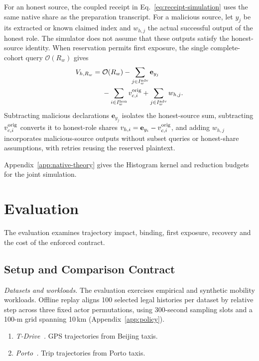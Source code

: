 \documentclass[conference,compsoc]{IEEEtran}
\theoremstyle{definition}
\numberwithin{equation}{section}
\numberwithin{table}{section}
\numberwithin{figure}{section}
\theoremstyle{plain}
\begin{document}
For an honest source, the coupled receipt in Eq.~\eqref{eq:receipt-simulation}
uses the same native share as the preparation transcript. For a malicious
source, let \(y_j\) be its extracted or known claimed index and \(w_{h,j}\)
the actual successful output of the honest role. The simulator does not assume
that these outputs satisfy the honest-source identity. When reservation permits
first exposure, the single complete-cohort query \(\mathcal O(R_w)\) gives
\begin{equation}
\begin{split}
 V_{h,R_w}={}&\mathcal O(R_w)-\sum_{j\in I_w^{\rm adv}}\mathbf e_{y_j}\\
 &-\sum_{i\in I_w^{\rm hon}}v_{c,i}^{\rm orig}
 +\sum_{j\in I_w^{\rm adv}}w_{h,j}.
\end{split}
\label{eq:simulated-honest-export}
\end{equation}
Subtracting malicious declarations \(\mathbf e_{y_j}\) isolates the honest-source sum, subtracting \(v_{c,i}^{\rm orig}\) converts it to honest-role shares \(v_{h,i}=\mathbf e_{y_i}-v_{c,i}^{\rm orig}\), and adding \(w_{h,j}\) incorporates malicious-source outputs without subset queries or honest-share assumptions, with retries reusing the reserved plaintext.

Appendix~\ref{app:native-theory} gives the Histogram kernel and reduction
budgets for the joint simulation.


\section{Evaluation}
\label{sec:evaluation}

The evaluation examines trajectory impact, binding, first exposure, recovery and the cost of the enforced contract.

\subsection{Setup and Comparison Contract}
\label{sec:eval-setup-summary}

\emph{Datasets and workloads.} The evaluation exercises empirical and synthetic mobility workloads. Offline replay aligns 100 selected legal histories per dataset by relative step across three fixed actor permutations, using 300-second sampling slots and a 100-m grid spanning 10\,km (Appendix~\ref{app:policy}).
\begin{enumerate}
\setlength{\itemsep}{0pt}\setlength{\parskip}{0pt}\setlength{\topsep}{0pt}
\item \emph{T-Drive~\cite{Yuan2010Tdrive}.} GPS trajectories from Beijing taxis.
\item \emph{Porto~\cite{MoreiraMatias2015Porto}.} Trip trajectories from Porto taxis.
\end{enumerate}
\end{document}

